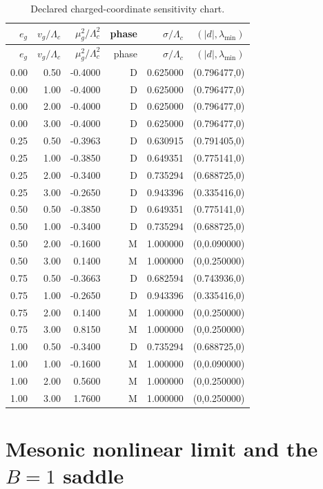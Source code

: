 \documentclass[11pt]{article}
\theoremstyle{definition}
\theoremstyle{remark}
\begin{document}
\begin{longtable}{@{}rrrrrr@{}}
\caption{Declared charged-coordinate sensitivity chart.}
\label{tab:charged-chart}\\
\toprule
\(e_g\) & \(v_g/\Lambda_c\) & \(\mu_g^2/\Lambda_c^2\) &
phase & \(\sigma/\Lambda_c\) & \((|d|,\lambda_{\min})\)\\
\midrule
\endfirsthead
\toprule
\(e_g\) & \(v_g/\Lambda_c\) & \(\mu_g^2/\Lambda_c^2\) &
phase & \(\sigma/\Lambda_c\) & \((|d|,\lambda_{\min})\)\\
\midrule
\endhead
0.00 & 0.50 & -0.4000 & D & 0.625000 & (0.796477,0)\\
0.00 & 1.00 & -0.4000 & D & 0.625000 & (0.796477,0)\\
0.00 & 2.00 & -0.4000 & D & 0.625000 & (0.796477,0)\\
0.00 & 3.00 & -0.4000 & D & 0.625000 & (0.796477,0)\\
0.25 & 0.50 & -0.3963 & D & 0.630915 & (0.791405,0)\\
0.25 & 1.00 & -0.3850 & D & 0.649351 & (0.775141,0)\\
0.25 & 2.00 & -0.3400 & D & 0.735294 & (0.688725,0)\\
0.25 & 3.00 & -0.2650 & D & 0.943396 & (0.335416,0)\\
0.50 & 0.50 & -0.3850 & D & 0.649351 & (0.775141,0)\\
0.50 & 1.00 & -0.3400 & D & 0.735294 & (0.688725,0)\\
0.50 & 2.00 & -0.1600 & M & 1.000000 & (0,0.090000)\\
0.50 & 3.00 &  0.1400 & M & 1.000000 & (0,0.250000)\\
0.75 & 0.50 & -0.3663 & D & 0.682594 & (0.743936,0)\\
0.75 & 1.00 & -0.2650 & D & 0.943396 & (0.335416,0)\\
0.75 & 2.00 &  0.1400 & M & 1.000000 & (0,0.250000)\\
0.75 & 3.00 &  0.8150 & M & 1.000000 & (0,0.250000)\\
1.00 & 0.50 & -0.3400 & D & 0.735294 & (0.688725,0)\\
1.00 & 1.00 & -0.1600 & M & 1.000000 & (0,0.090000)\\
1.00 & 2.00 &  0.5600 & M & 1.000000 & (0,0.250000)\\
1.00 & 3.00 &  1.7600 & M & 1.000000 & (0,0.250000)\\
\bottomrule
\end{longtable}

\section{Mesonic nonlinear limit and the
\texorpdfstring{\(B=1\)}{B=1} saddle}
\end{document}
